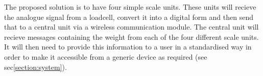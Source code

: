 The proposed solution is to have four simple scale units. These units will recieve the analogue signal from a loadcell, convert it into a digital form and then send that to a central unit via a wireless communication module. The central unit will recieve messages containing the weight from each of the four different scale units. It will then need to provide this information to a user in a standardised way in order to make it accessible from a generic device as required (see sec\ref{section:system}).%

